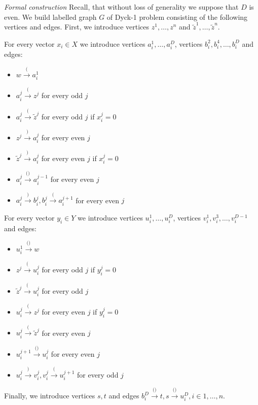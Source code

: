 \documentclass{amsart}
\begin{document}
	\emph{Formal construction} Recall, that without loss of generality we suppose that $D$ is even. We build labelled graph $G$ of Dyck-1 problem consisting of the following vertices and edges. First, we introduce vertices $z^1, \ldots, z^{n}$ and $\tilde{z}^1, \ldots, \tilde{z}^n$.
	
	For every vector $x_i \in X$ we introduce vertices $a_i^1, \ldots, a_i^D$, vertices $b_i^2, b_i^4, \ldots, b_i^D$ and edges:
	
	\begin{itemize}
		\item $w \xrightarrow{\text{(}} a_i^1$
		\item $a_i^j \xrightarrow{\text{(}} z^j$ for every odd $j$
		\item $a_i^j \xrightarrow{\text{(}} \tilde{z}^j$ for every odd $j$ if $x_i^j = 0$
		\item $z^j \xrightarrow{\text{)}} a_i^j$ for every even $j$
		\item $\tilde{z}^j \xrightarrow{\text{)}} a_i^j$ for every even $j$ if $x_i^j = 0$
		\item $a_i^{j} \xrightarrow{\text{()}} a_i^{j - 1}$ for every even $j$
		\item $a_i^{j} \xrightarrow{\text{)}} b_i^{j}, b_i^{j} \xrightarrow{\text{(}} a_i^{j+1}$ for every even $j$
	\end{itemize}

	For every vector $y_i \in Y$ we introduce vertices $u_i^1, \ldots, u_i^D$, vertices $v_i^1, v_i^3, \ldots, v_i^{D - 1}$ and edges:
	
	\begin{itemize}
		\item $u_i^1 \xrightarrow{\text{()}} w$
		\item $z^j \xrightarrow{\text{(}} u_i^j$ for every odd $j$ if $y_i^j = 0$
		\item $\tilde{z}^j \xrightarrow{\text{(}} u_i^j$ for every odd $j$
		\item $u_i^j \xrightarrow{\text{(}} z^j$ for every even $j$ if $y_i^j = 0$
		\item $u_i^j \xrightarrow{\text{(}} \tilde{z}^j$ for every even $j$
		\item $u_i^{j+1} \xrightarrow{\text{()}} u_i^{j}$ for every even $j$
		\item $u_i^{j} \xrightarrow{\text{)}} v_i^{j}, v_i^{j} \xrightarrow{\text{(}} u_i^{j+1}$ for every odd $j$
	\end{itemize}

	Finally, we introduce vertices $s, t$ and edges $b_i^{D} \xrightarrow{\text{()}} t, s \xrightarrow{\text{()}} u_i^{D}, i \in 1, \ldots, n$.
	
\end{document}
